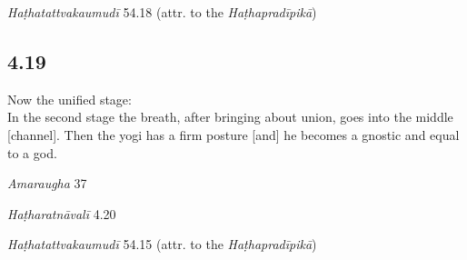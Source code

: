 \begin{ekdosis}
\begin{testimonia}[hp04_018]
\emph{Haṭhatattvakaumudī} 54.18 (attr. to the \emph{Haṭhapradīpikā})
\begin{versinnote}
\end{versinnote}
\end{testimonia}


\subsection*{4.19}
\begin{translation}[hp04_019]
Now the unified stage:\\
In the second stage the breath, after bringing about union, goes into the middle [channel]. Then the yogi has a firm posture [and] he becomes a gnostic and equal to a god.
\end{translation}


\begin{sources}[hp04_019]
\emph{Amaraugha} 37
\begin{versinnote}
\tl{\var{dvitīye saṅ- ] \emph{Amaraugha} : dvitīyāyāṃ \emph{Amaraughaprabodha}}\\!}
\end{versinnote}
\end{sources}

\begin{testimonia}[hp04_019]
\emph{Haṭharatnāvalī} 4.20
\begin{versinnote}
\end{versinnote}

\emph{Haṭhatattvakaumudī} 54.15 (attr. to the \emph{Haṭhapradīpikā})
\begin{versinnote}
\end{versinnote}
\end{testimonia}


\end{ekdosis}
